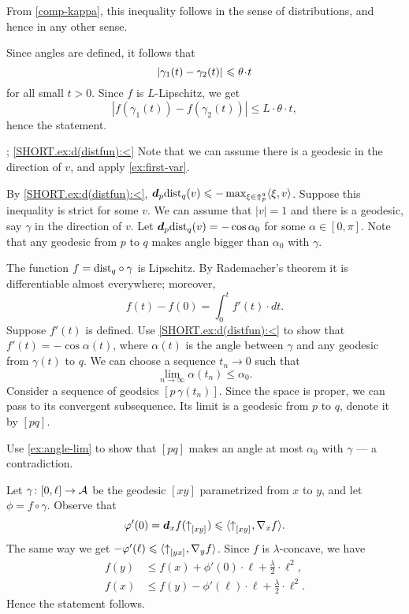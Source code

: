  From \ref{comp-kappa}, this inequality follows in the sense of distributions, and hence in any other sense.

Since angles are defined, it follows that 
\[\dist{\gamma_1(t)}{\gamma_2(t)}{}\le \theta\cdot t\]
for all small $t>0$.     
Since $f$ is $L$-Lipschitz, we get 
\[|f(\gamma_1(t))-f(\gamma_2(t))|\le L\cdot \theta\cdot t,\]
hence the statement.

\parbf{\ref{ex:d(distfun)}}; \ref{SHORT.ex:d(distfun):<}
Note that we can assume there is a geodesic in the direction of $v$, and apply \ref{ex:first-var}.

By \ref{SHORT.ex:d(distfun):<}, $\bm{d}_p\mathrm{dist}_q(v)\leqslant-\max_{\xi\in\Uparrow_p^q}\langle\xi,v\rangle$.
Suppose this inequality is strict for some $v$.
We can assume that $|v|=1$ and there is a geodesic, say $\gamma$ in the direction of $v$.
Let $\bm{d}_p\mathrm{dist}_q(v)=-\cos\alpha_0$ for some $\alpha\in [0,\pi]$.
Note that any geodesic from $p$ to $q$ makes angle bigger than $\alpha_0$ with $\gamma$.


The function $f=\mathrm{dist}_q\circ\gamma$ is Lipschitz.
By Rademacher's theorem it is differentiable almost everywhere;
moreover, 
\[f(t)-f(0)=\int_0^t f'(t)\cdot dt.\]
Suppose $f'(t)$ is defined.
Use \ref{SHORT.ex:d(distfun):<} to show that 
$f'(t)=-\cos\alpha(t)$, where $\alpha(t)$ is the angle between $\gamma$ and any geodesic from $\gamma(t)$ to $q$.
We can choose a sequence $t_n\to 0$ such that 
\[\lim_{n\to\infty}\alpha(t_n) \le \alpha_0.\]
Consider a sequence of geodsics $[p\,\gamma(t_n)]$.
Since the space is proper, we can pass to its convergent subsequence.
Its limit is a geodesic from $p$ to $q$, denote it by $[pq]$.

Use \ref{ex:angle-lim} to show that $[pq]$ makes an angle at most $\alpha_0$ with $\gamma$ --- a contradiction.
 
Let $\gamma\colon[0,\ell]\to \mathcal{A}$ be the geodesic $[xy]$ parametrized from $x$ to $y$,
and let $\phi=f\circ\gamma$.
Observe that 
\[\varphi'(0)=\bm{d}_xf({\uparrow}_{[{x}{y}]_{{}}})\leqslant \langle{\uparrow}_{[{x}{y}]_{{}}},\nabla_{x}f\rangle.\]
The same way we get $-\varphi'(\ell)\leqslant \langle{\uparrow}_{[{y}{x}]_{{}}},\nabla_{y}f\rangle$.
Since $f$ is $\lambda$-concave, we have
\begin{align*}
f(y)&\le f(x)+\phi'(0)\cdot \ell+\tfrac\lambda2\cdot\ell^2,
\\
f(x)&\le f(y)-\phi'(\ell)\cdot \ell+\tfrac\lambda2\cdot\ell^2.
\end{align*}
Hence the statement follows.

